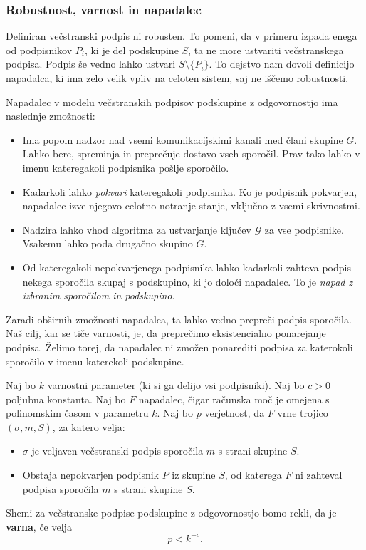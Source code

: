 \documentclass[isrm2, tisk]{fmfdelo}
\begin{document}
\subsubsection{Robustnost, varnost in napadalec}
Definiran večstranski podpis ni robusten. To pomeni, da v primeru izpada enega od podpisnikov $P_i$, 
ki je del podskupine $S$, ta ne more ustvariti večstranskega podpisa. Podpis še vedno lahko ustvari 
$S \setminus \{P_i\}$. To dejstvo nam dovoli definicijo napadalca, ki ima zelo velik vpliv na celoten 
sistem, saj ne iščemo robustnosti. 

\begin{definicija}
\label{def:asm-napadalec}
    Napadalec v modelu večstranskih podpisov podskupine z odgovornostjo ima naslednje zmožnosti:
    \begin{itemize}
        \item Ima popoln nadzor nad vsemi komunikacijskimi kanali med člani skupine $G$. Lahko bere, 
            spreminja in preprečuje dostavo vseh sporočil. Prav tako lahko v imenu kateregakoli 
            podpisnika pošlje sporočilo.
        \item Kadarkoli lahko \textit{pokvari} kateregakoli podpisnika. Ko je podpisnik pokvarjen, 
            napadalec izve njegovo celotno notranje stanje, vključno z vsemi skrivnostmi.
        \item Nadzira lahko vhod algoritma za ustvarjanje ključev $\mathcal{G}$ za vse podpisnike. 
            Vsakemu lahko poda drugačno skupino $G$.
        \item Od kateregakoli nepokvarjenega podpisnika lahko kadarkoli zahteva podpis nekega sporočila 
            skupaj s podskupino, ki jo določi napadalec. To je \textit{napad z izbranim sporočilom 
            in podskupino}.
    \end{itemize}
\end{definicija}

Zaradi obširnih zmožnosti napadalca, ta lahko vedno prepreči podpis sporočila. Naš cilj, kar se 
tiče varnosti, je, da preprečimo eksistencialno ponarejanje podpisa. Želimo torej, da napadalec ni 
zmožen ponarediti podpisa za katerokoli sporočilo v imenu katerekoli podskupine.

\begin{definicija}
\label{def:asm-varnost}
    Naj bo $k$ varnostni parameter (ki si ga delijo vsi podpisniki). Naj bo $c > 0$ poljubna konstanta. 
    Naj bo $F$ napadalec, čigar računska moč je omejena s polinomskim časom v parametru $k$. Naj bo 
    $p$ verjetnost, da  $F$ vrne trojico $(\sigma, m, S)$, za katero velja: 
    \begin{itemize}
        \item $\sigma$ je veljaven večstranski podpis sporočila $m$ s strani skupine $S$.
        \item Obstaja nepokvarjen podpisnik $P$ iz skupine $S$, od katerega $F$ ni zahteval podpisa 
            sporočila $m$ s strani skupine $S$.
    \end{itemize}
    Shemi za večstranske 
    podpise podskupine z odgovornostjo bomo rekli, da je \textbf{varna}, če velja 
    $$ 
    p < k^{-c}.
    $$
\end{definicija}
\end{document}
